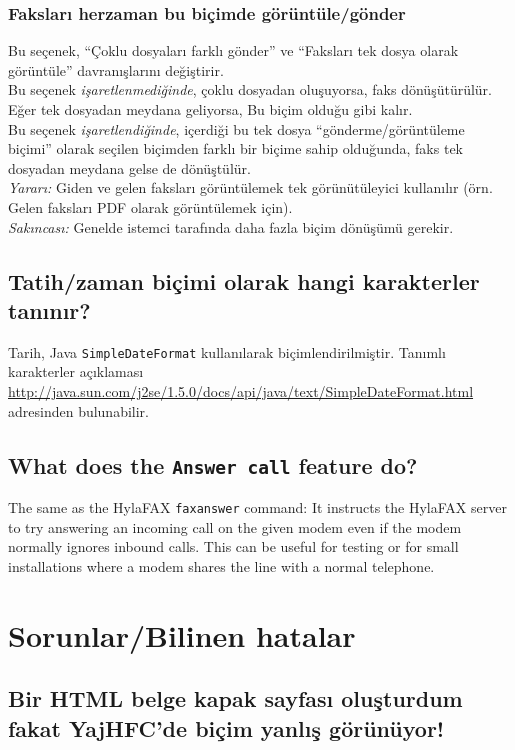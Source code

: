 \documentclass[a4paper,10pt]{scrartcl}
\begin{document}
\subsubsection{Faksları herzaman bu biçimde görüntüle/gönder}
Bu seçenek, ``Çoklu dosyaları farklı gönder'' ve ``Faksları tek dosya olarak görüntüle'' davranışlarını değiştirir.\\
Bu seçenek \textit{işaretlenmediğinde}, çoklu dosyadan oluşuyorsa, faks dönüşütürülür. Eğer tek dosyadan meydana geliyorsa, Bu biçim olduğu gibi kalır.\\
Bu seçenek \textit{işaretlendiğinde}, içerdiği bu tek dosya ``gönderme/görüntüleme biçimi'' olarak seçilen biçimden farklı bir biçime sahip olduğunda, faks tek dosyadan meydana gelse de dönüştülür.\\
\textit{Yararı:} Giden ve gelen faksları görüntülemek tek görünütüleyici kullanılır (örn. Gelen faksları PDF olarak görüntülemek için).\\
\textit{Sakıncası:} Genelde istemci tarafında daha fazla biçim dönüşümü gerekir.

\subsection{Tatih/zaman biçimi olarak hangi karakterler tanınır?}

Tarih, Java \texttt{SimpleDateFormat} kullanılarak biçimlendirilmiştir. Tanımlı karakterler açıklaması \url{http://java.sun.com/j2se/1.5.0/docs/api/java/text/SimpleDateFormat.html} adresinden bulunabilir.

\subsection{What does the \texttt{Answer call} feature do?}

The same as the HylaFAX \verb#faxanswer# command: It instructs the HylaFAX server to try answering an incoming call on the given modem even if the modem normally ignores inbound calls. This can be useful for testing or for small installations where a modem shares the line with a normal telephone.

\section{Sorunlar/Bilinen hatalar}

\subsection{Bir HTML belge kapak sayfası oluşturdum fakat YajHFC'de biçim yanlış görünüyor!}
\end{document}
